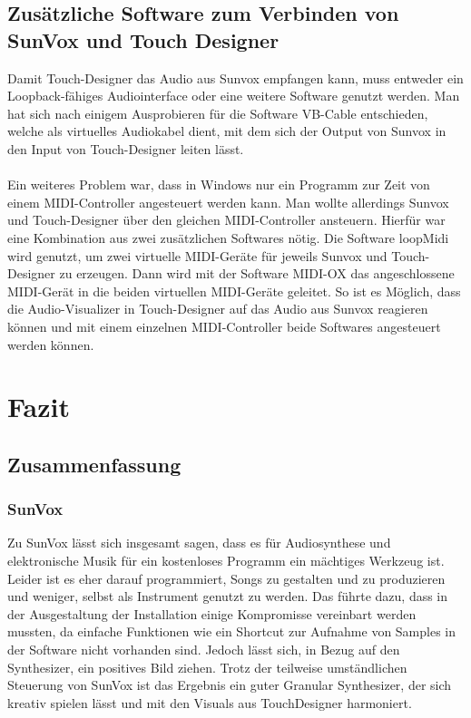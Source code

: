 \documentclass[12pt]{scrartcl}%
\theoremstyle{nonumberplain}
\begin{document}
\subsection{Zusätzliche Software zum Verbinden von SunVox und Touch Designer}

Damit Touch-Designer das Audio aus Sunvox empfangen kann, muss entweder ein Loopback-fähiges Audiointerface oder eine weitere Software genutzt werden. Man hat sich nach einigem Ausprobieren für die Software VB-Cable entschieden, welche als virtuelles Audiokabel dient, mit dem sich der Output von Sunvox in den Input von Touch-Designer leiten lässt.
\\\\
Ein weiteres Problem war, dass in Windows nur ein Programm zur Zeit von einem MIDI-Controller angesteuert werden kann. Man wollte allerdings Sunvox und Touch-Designer über den gleichen MIDI-Controller ansteuern. Hierfür war eine Kombination aus zwei zusätzlichen Softwares nötig. Die Software loopMidi wird genutzt, um zwei virtuelle MIDI-Geräte für jeweils Sunvox und Touch-Designer zu erzeugen. Dann wird mit der Software MIDI-OX das angeschlossene MIDI-Gerät in die beiden virtuellen MIDI-Geräte geleitet.
So ist es Möglich, dass die Audio-Visualizer in Touch-Designer auf das Audio aus Sunvox reagieren können und mit einem einzelnen MIDI-Controller beide Softwares angesteuert werden können.

\section{Fazit}

\subsection{Zusammenfassung}

\subsubsection{SunVox}

Zu SunVox lässt sich insgesamt sagen, dass es für Audiosynthese und elektronische Musik für ein kostenloses Programm ein mächtiges Werkzeug ist. Leider ist es eher darauf programmiert, Songs zu gestalten und zu produzieren und weniger, selbst als Instrument genutzt zu werden. Das führte dazu, dass in der Ausgestaltung der Installation einige Kompromisse vereinbart werden mussten, da einfache Funktionen wie ein Shortcut zur Aufnahme von Samples in der Software nicht vorhanden sind. Jedoch lässt sich, in Bezug auf den Synthesizer, ein positives Bild ziehen. Trotz der teilweise umständlichen Steuerung von SunVox ist das Ergebnis ein guter Granular Synthesizer, der sich kreativ spielen lässt und mit den Visuals aus TouchDesigner harmoniert.
\end{document}
